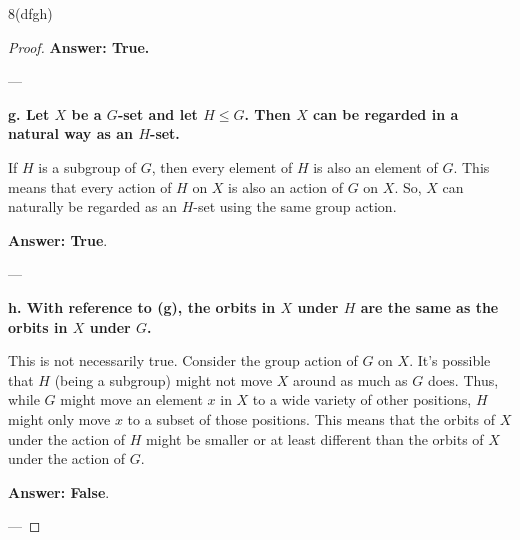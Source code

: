 \documentclass[12pt]{amsart}
\theoremstyle{definition}
\numberwithin{equation}{section}
\theoremstyle{plain}
\begin{document}
\begin{exercise}{8(dfgh)}
\begin{proof}
\textbf{Answer: True.}

---

\textbf{g. Let \(X\) be a \(G\)-set and let \(H \leq G\). Then \(X\) can be regarded in a natural way as an \(H\)-set.}

If \(H\) is a subgroup of \(G\), then every element of \(H\) is also an element of \(G\). This means that every action of \(H\) on \(X\) is also an action of \(G\) on \(X\). So, \(X\) can naturally be regarded as an \(H\)-set using the same group action.

\textbf{Answer: True}.

---

\textbf{h. With reference to (g), the orbits in \(X\) under \(H\) are the same as the orbits in \(X\) under \(G\).}

This is not necessarily true. Consider the group action of \(G\) on \(X\). It's possible that \(H\) (being a subgroup) might not move \(X\) around as much as \(G\) does. Thus, while \(G\) might move an element \(x\) in \(X\) to a wide variety of other positions, \(H\) might only move \(x\) to a subset of those positions. This means that the orbits of \(X\) under the action of \(H\) might be smaller or at least different than the orbits of \(X\) under the action of \(G\).

\textbf{Answer: False}.

---
    \end{proof}
    
\end{exercise}
\vspace*{20pt}
\end{document}
